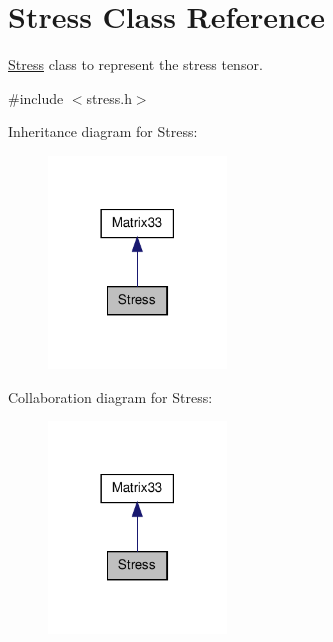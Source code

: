 \hypertarget{classStress}{\section{\-Stress \-Class \-Reference}
\label{d1/d1c/classStress}
}


\hyperlink{classStress}{\-Stress} class to represent the stress tensor.  




{\ttfamily \#include $<$stress.\-h$>$}



\-Inheritance diagram for \-Stress\-:\nopagebreak
\begin{figure}[H]
\begin{center}
\leavevmode
\includegraphics[width=134pt]{dd/d46/classStress__inherit__graph}
\end{center}
\end{figure}


\-Collaboration diagram for \-Stress\-:\nopagebreak
\begin{figure}[H]
\begin{center}
\leavevmode
\includegraphics[width=134pt]{d7/dfa/classStress__coll__graph}
\end{center}
\end{figure}
